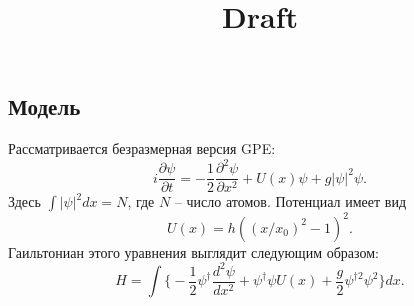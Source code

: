 \documentclass[12pt]{article}
\title{Draft}
\begin{document}
\maketitle

\newcommand{\sn}{\textrm{sn}}
\newcommand{\cn}{\textrm{cn}}
\newcommand{\dn}{\textrm{dn}}
\newcommand{\sd}{\textrm{sd}}
\newcommand{\cd}{\textrm{cd}}
\newcommand{\nd}{\textrm{nd}}
\newcommand{\am}{\textrm{am}}

\subsection*{Модель}

Рассматривается безразмерная версия GPE:
%
\begin{equation}
i \dfrac{\partial \psi}{\partial t} = -\dfrac{1}{2} \dfrac{\partial^2 \psi}{\partial x^2} + U(x) \psi + g |\psi|^2 \psi.
\label{eq:GPE} 
\end{equation}
%
Здесь $\int |\psi|^2 dx = N$, где $N$ -- число атомов.
Потенциал имеет вид
%
\begin{equation}
U(x) = h ((x/x_0)^2 - 1)^2.
\label{eq:gpe_potential}
\end{equation}
%
Гаильтониан этого уравнения выглядит следующим образом:
%
\begin{equation}
H = \int \Big\{ -\dfrac{1}{2} \psi^\dag \dfrac{d^2 \psi}{dx^2} + \psi^\dag \psi U(x) + \dfrac{g}{2} \psi^{\dag 2} \psi^2  \Big\} dx.
\label{eq:gpe_hamiltonian}
\end{equation}
%
\end{document}
